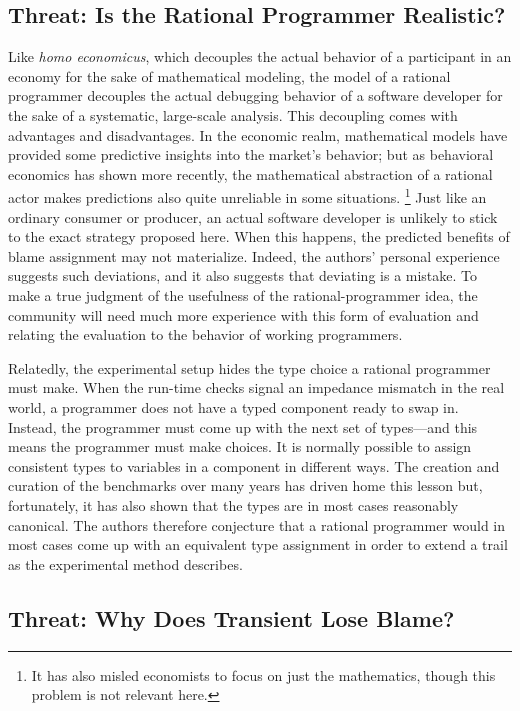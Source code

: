 \subsection{Threat: Is the Rational Programmer Realistic?}

Like {\em homo economicus\/}, which decouples the actual behavior of a
participant in an economy for the sake of mathematical modeling, the model of a
rational programmer decouples the actual debugging behavior of a software
developer for the sake of a systematic, large-scale analysis. This decoupling
comes with advantages and disadvantages. In the economic realm, mathematical models
have provided some predictive insights into the market's behavior; but as
behavioral economics has shown more recently, the mathematical abstraction of a
rational actor makes predictions also quite unreliable in some situations.
\footnote{It has also misled economists to focus on just the mathematics, though
this problem is not relevant here.}  Just like an ordinary consumer or producer,
an actual software developer is unlikely to stick to the exact strategy proposed
here. When this happens, the predicted benefits of blame assignment may not
materialize. Indeed, the authors' personal experience suggests such deviations, and
it also suggests that deviating is a mistake. To make a true judgment of the
usefulness of the rational-programmer idea, the community will need much more
experience with this form of evaluation and relating the evaluation to the
behavior of working programmers.

Relatedly, the experimental setup hides the type choice a rational programmer must make. When the
run-time checks signal an impedance mismatch in the real world, a programmer
does not have a typed component ready to swap in. Instead, the programmer must
come up with the next set of types---and this means the programmer must make
choices. It is normally possible to assign consistent types to variables in a
component in different ways. The creation and curation of the benchmarks over
many years has driven home this lesson but, fortunately, it has also shown that
the types are in most cases reasonably canonical.  The authors therefore conjecture that
a rational programmer would in most cases come up with an equivalent type
assignment in order to extend a trail as the experimental method describes.

\subsection{Threat: Why Does Transient Lose Blame?} \label{sec:threat:transient}

